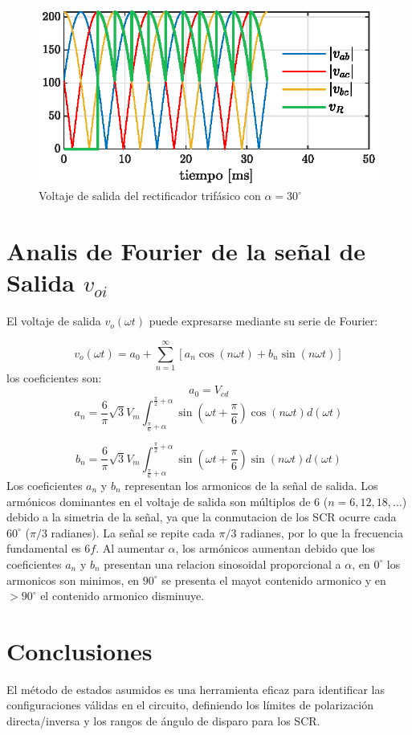 \documentclass[conference]{IEEEtran}
\begin{document}
\begin{figure}[ht]
	\centering
	\includegraphics[scale=1]{Fig/volt_lin_R30.eps}
	\caption{Voltaje de salida del rectificador trifásico con $\alpha=30^\circ$}
	\label{fig:v_oi_tre}
\end{figure}

\section{Analis de Fourier de la señal de Salida $v_{oi}$}
El voltaje de salida \(v_o(\omega t)\) puede expresarse mediante su serie de Fourier:

\[
v_o(\omega t) = a_0 + \sum_{n=1}^{\infty} \left[a_n \cos(n\omega t) + b_n \sin(n\omega t)\right]
\]
los coeficientes son:
\[
a_0 = V_{cd}
\]
\[
a_n = \frac{6}{\pi} \sqrt{3} V_m \int_{\frac{\pi}{6} + \alpha}^{\frac{\pi}{2} + \alpha} \sin\left(\omega t + \frac{\pi}{6}\right) \cos(n\omega t)  d(\omega t)
\]

\[
b_n = \frac{6}{\pi} \sqrt{3} V_m \int_{\frac{\pi}{6} + \alpha}^{\frac{\pi}{2} + \alpha} \sin\left(\omega t + \frac{\pi}{6}\right) \sin(n\omega t)  d(\omega t)
\]
Los coeficientes $a_{n}$ y $b_{n}$ representan los armonicos de la señal de salida. 
Los armónicos dominantes en el voltaje de salida son múltiplos de 6 (\(n = 6, 12, 18, \ldots\)) 
debido a la simetria de la señal, ya que la conmutacion de los SCR ocurre cada \(60^\circ\) 
(\(\pi/3\) radianes). La señal se repite cada \(\pi/3\) radianes, por lo que la frecuencia 
fundamental es \(6f\).  Al aumentar \(\alpha\), los armónicos aumentan debido que los coeficientes 
 $a_{n}$ y $b_{n}$ presentan una relacion sinosoidal proporcional a \(\alpha\), en \(0^\circ\) los armonicos 
 son minimos, en \(90^\circ\) se presenta el mayot contenido armonico y en \(>90^\circ\) el contenido armonico
 disminuye. 


\section{Conclusiones}
El método de estados asumidos es una herramienta eficaz para identificar las configuraciones válidas en el circuito, definiendo los límites de polarización directa/inversa
y los rangos de ángulo de disparo para los SCR.
\end{document}
